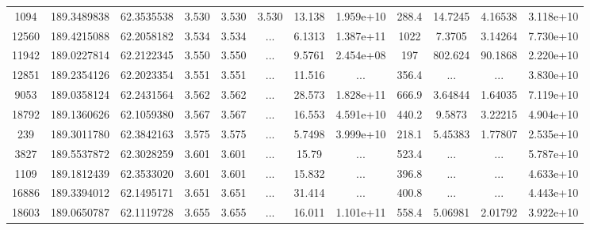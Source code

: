 \begin{table*}
\begin{tabular}{cccccccccccc}
           1094 &     189.3489838 &      62.3535538 &           3.530 &           3.530 &           3.530 &          13.138 &       1.959e+10 &           288.4 &         14.7245 &         4.16538 &       3.118e+10 \\
          12560 &     189.4215088 &      62.2058182 &           3.534 &           3.534 &             ... &          6.1313 &       1.387e+11 &            1022 &          7.3705 &         3.14264 &       7.730e+10 \\
          11942 &     189.0227814 &      62.2122345 &           3.550 &           3.550 &             ... &          9.5761 &       2.454e+08 &             197 &         802.624 &         90.1868 &       2.220e+10 \\
          12851 &     189.2354126 &      62.2023354 &           3.551 &           3.551 &             ... &          11.516 &             ... &           356.4 &             ... &             ... &       3.830e+10 \\
           9053 &     189.0358124 &      62.2431564 &           3.562 &           3.562 &             ... &          28.573 &       1.828e+11 &           666.9 &         3.64844 &         1.64035 &       7.119e+10 \\
          18792 &     189.1360626 &      62.1059380 &           3.567 &           3.567 &             ... &          16.553 &       4.591e+10 &           440.2 &          9.5873 &         3.22215 &       4.904e+10 \\
            239 &     189.3011780 &      62.3842163 &           3.575 &           3.575 &             ... &          5.7498 &       3.999e+10 &           218.1 &         5.45383 &         1.77807 &       2.535e+10 \\
           3827 &     189.5537872 &      62.3028259 &           3.601 &           3.601 &             ... &           15.79 &             ... &           523.4 &             ... &             ... &       5.787e+10 \\
           1109 &     189.1812439 &      62.3533020 &           3.601 &           3.601 &             ... &          15.832 &             ... &           396.8 &             ... &             ... &       4.633e+10 \\
          16886 &     189.3394012 &      62.1495171 &           3.651 &           3.651 &             ... &          31.414 &             ... &           400.8 &             ... &             ... &       4.443e+10 \\
          18603 &     189.0650787 &      62.1119728 &           3.655 &           3.655 &             ... &          16.011 &       1.101e+11 &           558.4 &         5.06981 &         2.01792 &       3.922e+10 \\

\end{tabular}
\end{table*}
